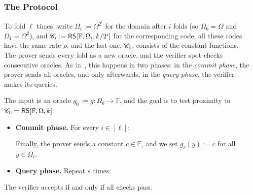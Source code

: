 \documentclass[../../book]{subfiles}
\begin{document}
\subsubsection{The Protocol}\label{subsubsec:fri-protocol}

To fold $\ell$ times, write $\Omega_i := \Omega^{2^i}$ for the domain after $i$ folds (so $\Omega_0 = \Omega$ and $\Omega_1 = \Omega^2$), and $\mathscr{C}_i := \mathsf{RS}[\mathbb{F}, \Omega_i, k/2^i]$ for the corresponding code; all these codes have the same rate $\rho$, and the last one, $\mathscr{C}_\ell$, consists of the constant functions.
The prover sends every fold as a new oracle, and the verifier spot-checks consecutive oracles.
As in~\cite{bensasson18}, this happens in two phases: in the \emph{commit phase}, the prover sends all oracles, and only afterwards, in the \emph{query phase}, the verifier makes its queries.

\begin{definition}[FRI]\label{def:fri}
    The input is an oracle $g_0 := g: \Omega_0 \to \mathbb{F}$, and the goal is to test proximity to $\mathscr{C}_0 = \mathsf{RS}[\mathbb{F}, \Omega, k]$.
    \begin{itemize}
        \item \textbf{Commit phase.} For every $i \in [\ell]$:
        Finally, the prover sends a constant $c \in \mathbb{F}$, and we set $g_\ell(y) := c$ for all $y \in \Omega_\ell$.
        \item \textbf{Query phase.} Repeat $s$ times:
    \end{itemize}
    The verifier accepts if and only if all checks pass.
\end{definition}
\end{document}

